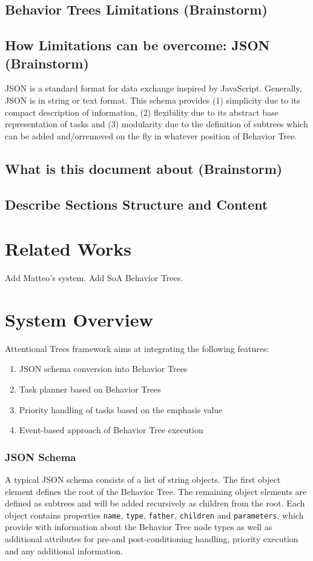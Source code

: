 \documentclass[conference]{IEEEtran}
\begin{document}
\subsection{Behavior Trees Limitations (Brainstorm)}
\subsection{How Limitations can be overcome: JSON (Brainstorm)}
JSON is a standard format for data exchange inspired by JavaScript. Generally, JSON is in string or text format.
This schema provides (1) simplicity due to its compact description of information, (2) flexibility due to its abstract base representation of tasks and (3) modularity due to the definition of subtrees which can be added and/orremoved on the fly in whatever position of Behavior Tree.
\subsection{What is this document about (Brainstorm)}
\subsection{Describe Sections Structure and Content}
\section{Related Works}
Add Matteo's system. Add SoA Behavior Trees.


\section{System Overview}
Attentional Trees framework aims at integrating the following features:
\begin{enumerate}
\item JSON schema conversion into Behavior Trees 
\item Task planner based on Behavior Trees
\item Priority handling of tasks based on the emphasis value \cite{b2}
\item Event-based approach of Behavior Tree  execution
\end{enumerate}
\subsubsection{JSON Schema}
 A typical JSON schema consists of a list of string objects. The first object element defines the root of the Behavior Tree. The remaining object elements are defined as subtrees and will be added recursively as children from the root. Each object contains properties \verb|name|, \verb|type|, \verb|father|, \verb|children| and \verb|parameters|, which provide with information about the Behavior Tree node types as well as additional attributes for pre-and post-conditioning handling, priority execution and any additional information. 
 
\end{document}
